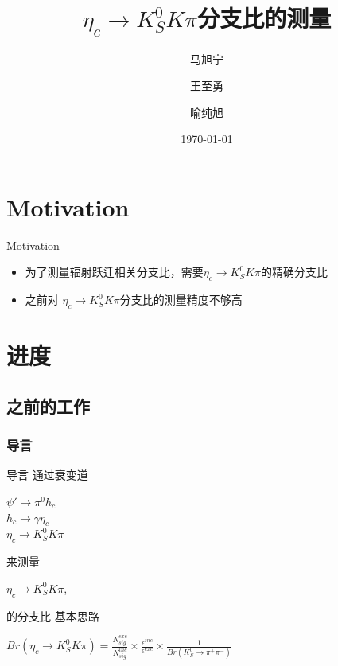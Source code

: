 \documentclass{beamer}
\title[考核报告]{$\eta_c\to K_S^0 K \pi$分支比的测量}
\author{马旭宁\inst{1} \and 王至勇\inst{2} \and 喻纯旭\inst{1}}
\institute[]{\inst{1} 南开大学 \and \inst{2} 高能所}
\date{\today}
\begin{document}
\begin{frame}
\titlepage
\end{frame}


\section{Motivation}
\begin{frame}{Motivation}
\begin{itemize}
\item 为了测量辐射跃迁相关分支比，需要$\eta_c \to K_S^0 K \pi$的精确分支比\\
\item 之前对 $\eta_c \to K_S^0 K \pi$分支比的测量精度不够高\\
\end{itemize}
\end{frame}

\section{进度}
\subsection{之前的工作}
\subsubsection{导言}
\begin{frame}{导言}
通过衰变道
\begin{center}
$\psi\prime\to\pi^0h_c$\\
$h_c\to\gamma\eta_c$\\
$\eta_c \to K_S^0 K \pi$\\
\end{center}
来测量\\
\begin{center}
$\eta_c \to K_S^0 K \pi$,\\
\end{center}
的分支比
\bigskip
基本思路
        \begin{center}
$Br(\eta_c\to K^0_S K \pi) = 
\frac{ N^{exc}_{sig} }{ N^{inc}_{sig} } 
\times \frac{ \epsilon^{inc} }{ \epsilon^{exc} }
\times \frac{ 1 }{ Br(K^0_S\to\pi^+\pi^-) }
$
\end{center}
\end{frame}
\end{document}
